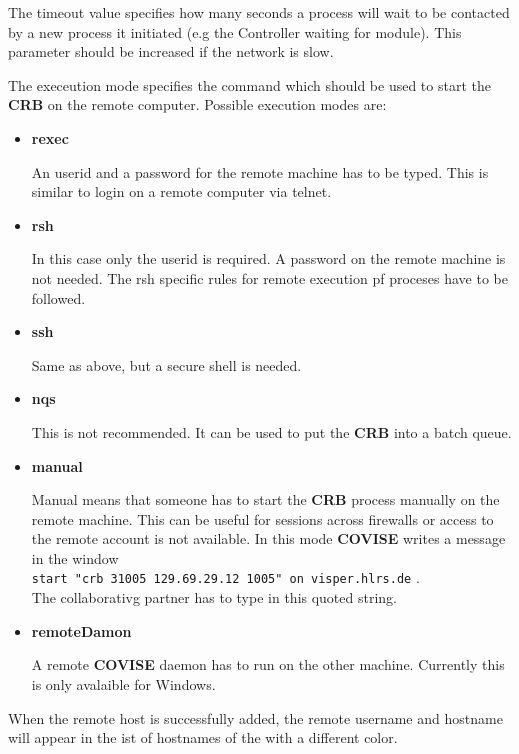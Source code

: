 	 The timeout value specifies how many seconds a process will wait to be contacted by a new process
	 it initiated (e.g the Controller waiting for module). This parameter should be increased if the  network is slow.

	 The execeution mode specifies the command which should be used to start the {\bf CRB} 
	 on the remote computer. Possible execution modes are:

	 \begin{itemize}
	 \item {\bf rexec}

	 An userid and a password for the remote machine has to be typed. This is similar to login 
	 on a remote computer via telnet.

	 \item {\bf rsh}

	 In this case only the userid is required. A password on the remote machine is not needed. The rsh specific 
    rules for remote execution pf proceses have to be followed.

	 \item {\bf ssh}

	 Same as above, but a secure shell is needed. 

	 \item {\bf nqs}

	 This is not recommended. It can be used to put the {\bf CRB} into a batch queue.

	 \item {\bf manual} 

	 Manual means that someone has to start the {\bf CRB} process manually on the remote machine.
	 This can be useful for sessions across firewalls or access to the remote account is not available.
	 In this mode {\bf COVISE} writes a message in the window  \\
	 \verb/start "crb 31005 129.69.29.12 1005" on visper.hlrs.de/ . \\
	 The collaborativg partner has to type in this quoted string. 
    
	 \item {\bf remoteDamon} 

	 A remote {\bf COVISE} daemon has to run on the other machine. Currently this is only avalaible for Windows. 
    
	 \end{itemize}

	 When the remote host is successfully added, the remote username and hostname will appear 
    in the ist of hostnames of the {\mymodulebrowser} with a different color. 
 
